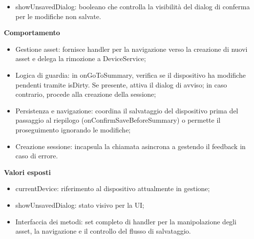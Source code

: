 \documentclass[a4paper,12pt]{article}
\begin{document}
                \begin{itemize}
                    \item {\ttfamily showUnsavedDialog}: booleano che controlla la visibilità del dialog di conferma per le modifiche non salvate.
                \end{itemize}
                \textbf{Comportamento}
                \begin{itemize}
                    \item Gestione asset: fornisce handler per la navigazione verso la creazione di nuovi asset e delega la rimozione a {\ttfamily DeviceService};
                    \item Logica di guardia: in {\ttfamily onGoToSummary}, verifica se il dispositivo ha modifiche pendenti tramite {\ttfamily isDirty}. Se presente, attiva il dialog di avviso; in caso contrario, procede alla creazione della sessione;
                    \item Persistenza e navigazione: coordina il salvataggio del dispositivo prima del passaggio al riepilogo ({\ttfamily onConfirmSaveBeforeSummary}) o permette il proseguimento ignorando le modifiche;
                    \item Creazione sessione: incapsula la chiamata asincrona a  gestendo il feedback in caso di errore.
                \end{itemize}
                \textbf{Valori esposti}
                \begin{itemize}
                    \item {\ttfamily currentDevice}: riferimento al dispositivo attualmente in gestione;
                    \item {\ttfamily showUnsavedDialog}: stato visivo per la UI;
                    \item Interfaccia dei metodi: set completo di handler per la manipolazione degli asset, la navigazione e il controllo del flusso di salvataggio.
                \end{itemize}
                
\end{document}
